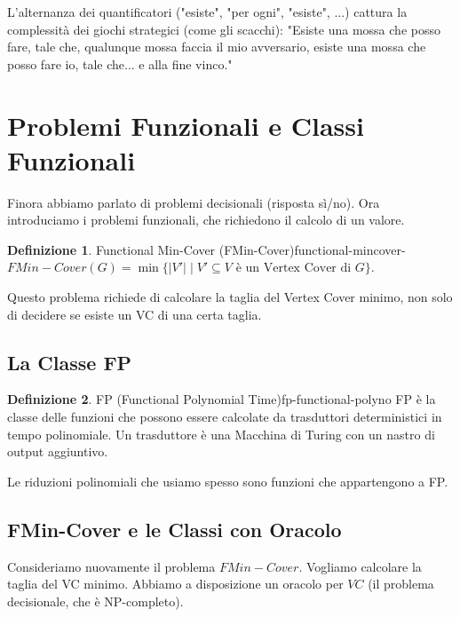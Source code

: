 \documentclass[a4paper]{article}
\theoremstyle{definition} %
\newtheorem{definition}{Definizione}
\begin{document}
L'alternanza dei quantificatori ("esiste", "per ogni", "esiste", ...) cattura la complessità dei giochi strategici (come gli scacchi): "Esiste una mossa che posso fare, tale che, qualunque mossa faccia il mio avversario, esiste una mossa che posso fare io, tale che... e alla fine vinco."

\section{Problemi Funzionali e Classi Funzionali}
Finora abbiamo parlato di problemi decisionali (risposta sì/no). Ora introduciamo i problemi funzionali, che richiedono il calcolo di un valore.

\begin{definition}{Functional Min-Cover (FMin-Cover)}{functional-mincover-}
$FMin-Cover(G) = \min \{ |V'| \mid V' \subseteq V \text{ è un Vertex Cover di } G \}$.
\end{definition}
Questo problema richiede di calcolare la taglia del Vertex Cover minimo, non solo di decidere se esiste un VC di una certa taglia.

\subsection{La Classe FP}
\begin{definition}{FP (Functional Polynomial Time)}{fp-functional-polyno}
FP è la classe delle funzioni che possono essere calcolate da trasduttori deterministici in tempo polinomiale. Un trasduttore è una Macchina di Turing con un nastro di output aggiuntivo.
\end{definition}
Le riduzioni polinomiali che usiamo spesso sono funzioni che appartengono a FP.

\subsection{FMin-Cover e le Classi con Oracolo}
Consideriamo nuovamente il problema $FMin-Cover$. Vogliamo calcolare la taglia del VC minimo. Abbiamo a disposizione un oracolo per $VC$ (il problema decisionale, che è NP-completo).
\end{document}
